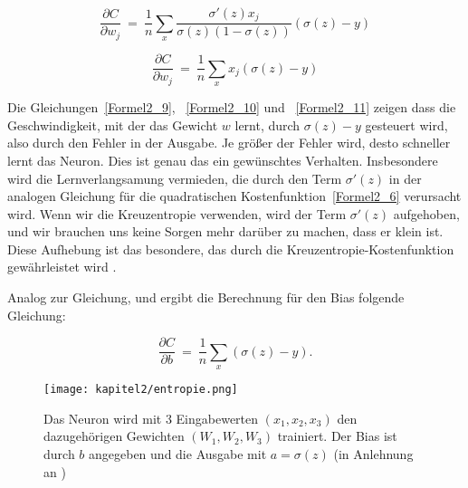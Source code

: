   \begin{equation} \label{Formel2_10}
    \frac{\partial C}{\partial w_{j}} \ =\ \frac{1}{n}\sum _{x}\frac{\sigma '( z) x_{j}}{\sigma ( z)( 1-\sigma ( z))}( \sigma ( z) -y)
  \end{equation}

  \begin{equation} \label{Formel2_11}
    \frac{\partial C}{\partial w_{j}} \ =\ \frac{1}{n}\sum _{x} x_{j}( \sigma ( z) -y)
  \end{equation}


  Die Gleichungen~\ref{Formel2_9}, ~\ref{Formel2_10} und ~\ref{Formel2_11} zeigen dass die Geschwindigkeit, mit der das Gewicht $w$  lernt, durch $\sigma(z) - y$ gesteuert wird, also durch den Fehler in der Ausgabe. Je größer der Fehler wird, desto schneller lernt das Neuron. Dies ist genau das ein gewünschtes Verhalten. Insbesondere wird die Lernverlangsamung vermieden, die durch den Term $\sigma'(z)$ in der analogen Gleichung für die quadratischen Kostenfunktion~\ref{Formel2_6} verursacht wird. Wenn wir die Kreuzentropie verwenden, wird der Term $\sigma'(z)$ aufgehoben, und wir brauchen uns keine Sorgen mehr darüber zu machen, dass er klein ist. Diese Aufhebung ist das besondere, das durch die Kreuzentropie-Kostenfunktion gewährleistet wird \cite[63-64]{Nielsen2015}.

Analog zur Gleichung\label{Formel2_9}, \label{Formel2_10} und \label{Formel2_11} ergibt die Berechnung für den Bias folgende Gleichung:

\begin{equation}
  \frac{\partial C}{\partial b} \ =\ \frac{1}{n}\sum _{x}( \sigma ( z) -y).
\end{equation}

\begin{figure}[H]
  \centering
  \texttt{[image: kapitel2/entropie.png]}
  \caption[Darstellung der Kreuzentropie am beispiel eines Neurons]{Das Neuron wird mit 3 Eingabewerten $(x_1, x_2, x_3)$ den dazugehörigen Gewichten $(W_1, W_2, W_3)$ trainiert. Der Bias ist durch $b$ angegeben und die Ausgabe mit $a = \sigma(z)$ (in Anlehnung an \cite*{Nielsen2015})}
  \label{Kap2:Entropie}
\end{figure}


